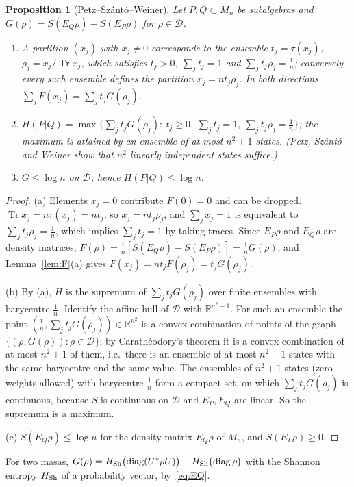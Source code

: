\documentclass[11pt]{article}
\DeclareMathOperator{\Tr}{Tr}
\newcommand{\R}{\mathbb{R}}
\newcommand{\D}{\mathcal{D}}
\theoremstyle{plain}
\newtheorem{proposition}[theorem]{Proposition}
\theoremstyle{definition}
\theoremstyle{remark}
\begin{document}
\begin{proposition}[Petz--Sz\'ant\'o--Weiner]\label{prop:psw}
Let $P,Q\subset M_n$ be subalgebras and $G(\rho)=S(E_Q\rho)-S(E_P\rho)$ for $\rho\in\D$.
\begin{enumerate}
\item[(a)] A partition $(x_j)$ with $x_j\ne0$ corresponds to the ensemble $t_j=\tau(x_j)$, $\rho_j=x_j/\Tr x_j$, which satisfies
$t_j>0$, $\sum_jt_j=1$ and $\sum_jt_j\rho_j=\frac1n$; conversely every such ensemble defines the partition $x_j=nt_j\rho_j$.
In both directions $\sum_jF(x_j)=\sum_jt_jG(\rho_j)$.
\item[(b)] $H(P|Q)=\max\bigl\{\sum_jt_jG(\rho_j):\ t_j\ge0,\ \sum_jt_j=1,\ \sum_jt_j\rho_j=\frac1n\bigr\}$; the maximum is attained by
an ensemble of at most $n^2+1$ states. (Petz, Sz\'ant\'o and Weiner show that $n^2$ linearly independent states suffice.)
\item[(c)] $G\le\log n$ on $\D$, hence $H(P|Q)\le\log n$.
\end{enumerate}
\end{proposition}
\begin{proof}
(a) Elements $x_j=0$ contribute $F(0)=0$ and can be dropped. $\Tr x_j=n\tau(x_j)=nt_j$, so $x_j=nt_j\rho_j$, and $\sum_jx_j=1$ is equivalent to $\sum_jt_j\rho_j=\frac1n$, which implies
$\sum_jt_j=1$ by taking traces. Since $E_P\rho$ and $E_Q\rho$ are density matrices, $F(\rho)=\frac1n[S(E_Q\rho)-S(E_P\rho)]=\frac1nG(\rho)$,
and Lemma~\ref{lem:F}(a) gives $F(x_j)=nt_jF(\rho_j)=t_jG(\rho_j)$.

(b) By (a), $H$ is the supremum of $\sum_jt_jG(\rho_j)$ over finite ensembles with barycentre $\frac1n$. Identify the affine
hull of $\D$ with $\R^{n^2-1}$. For such an ensemble the point $(\frac1n,\sum_jt_jG(\rho_j))\in\R^{n^2}$ is a convex combination of
points of the graph $\{(\rho,G(\rho)):\rho\in\D\}$; by Carath\'eodory's theorem it is a convex combination of at most $n^2+1$
of them, i.e.\ there is an ensemble of at most $n^2+1$ states with the same barycentre and the same value. The ensembles of
$n^2+1$ states (zero weights allowed) with barycentre $\frac1n$ form a compact set, on which $\sum_jt_jG(\rho_j)$ is continuous,
because $S$ is continuous on $\D$ and $E_P,E_Q$ are linear. So the supremum is a maximum.

(c) $S(E_Q\rho)\le\log n$ for the density matrix $E_Q\rho$ of $M_n$, and $S(E_P\rho)\ge0$.
\end{proof}

For two masas, $G(\rho)=H_{\rm Sh}\bigl(\mathrm{diag}(U^*\rho U)\bigr)-H_{\rm Sh}\bigl(\mathrm{diag}\,\rho\bigr)$ with the Shannon
entropy $H_{\rm Sh}$ of a probability vector, by~\eqref{eq:EQ}.
\end{document}

